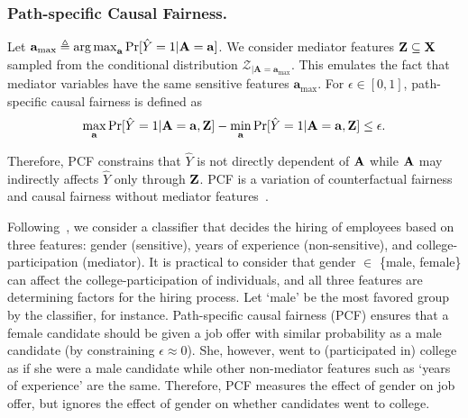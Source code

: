 \subsubsection{Path-specific Causal Fairness.}
Let $ \mathbf{a}_{\max}  \triangleq \operatorname*{arg\,max}_{ \mathbf{a}} \Pr[\hat{Y} =1 |\mathbf{A}=  \mathbf{a}] $. We consider mediator features $ \mathbf{Z} \subseteq \mathbf{X} $ sampled from the conditional distribution $ {\mathcal{Z}_{|\mathbf{A} = \mathbf{a}_{\max}}} $. This emulates the fact that mediator variables have the same sensitive features $ \mathbf{a}_{\max} $.  For $ \epsilon \in [0,1] $,  path-specific causal fairness is defined as 
\[
\max_{\mathbf{a}} \Pr[\hat{Y} = 1 | \mathbf{A} =  \mathbf{a}, \mathbf{Z}] -  \min_{\mathbf{a}} \Pr[\hat{Y} = 1 | \mathbf{A} = \mathbf{a}, \mathbf{Z} ] \le \epsilon.
\]

Therefore, PCF constrains that $ \hat{Y} $ is not directly dependent of $ \mathbf{A} $ while $ \mathbf{A} $ may indirectly affects $ \hat{Y} $ only through $ \mathbf{Z} $. PCF is a variation of counterfactual fairness and causal fairness without mediator features~\cite{bastani2019probabilistic}. 




\begin{example}
	Following~\cite{bastani2019probabilistic}, we consider a classifier that decides the hiring of employees based on three features: gender (sensitive), years of experience (non-sensitive), and college-participation (mediator). It is practical to consider that gender $ \in $ \{male, female\} can affect the college-participation of individuals, and all three features are determining factors for the hiring process. Let `male' be the most favored group by the classifier, for instance. Path-specific causal fairness (PCF) ensures that a female candidate should be given a job offer with similar probability as a male candidate (by constraining $ \epsilon \approx 0 $). She,  however,  went to (participated in) college as if she were a male candidate while other non-mediator features such as  `years of experience' are the same.  Therefore, PCF measures the effect of gender on job offer, but ignores the effect of gender on whether candidates went to college.
\end{example}	






